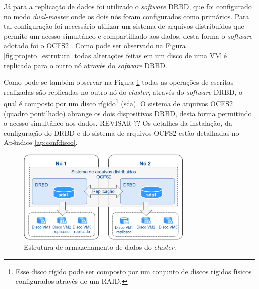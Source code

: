 \newpage
Já para a replicação de dados foi utilizado o \textit{software} \ac{DRBD}, que foi configurado no modo \textit{dual-master} onde os dois nós 
foram configurados como primários. Para tal configuração foi necessário utilizar um sistema de arquivos distribuídos que permite um acesso 
simultâneo e compartilhado aos dados, desta forma o \textit{software} adotado foi o \ac{OCFS2} \cite{ocfs2}. 
Como pode ser observado na Figura \ref{fig:projeto_estrutura} todas alterações feitas em um disco de uma \ac{VM} é replicada para o 
outro nó através do \textit{software} \ac{DRBD}. 

Como pode-se também observar na Figura \ref{fig:projeto_discos} todas as operações de escritas realizadas são replicadas no outro nó do
\textit{cluster}, através do \textit{software} \ac{DRBD}, o qual é composto por um disco rígido\footnote[1]{Esse disco rígido pode ser composto 
por um conjunto de discos rígidos físicos configurados através de um \ac{RAID}.} (sda). O sistema de arquivos \ac{OCFS2} (quadro pontilhado)
abrange os dois dispositivos \ac{DRBD}, desta forma permitindo o acesso simultâneo aos dados. 
REVISAR ??
Os detalhes da instalação, da configuração do \ac{DRBD} e do sistema de arquivos \ac{OCFS2} estão detalhadas no Apêndice \ref{ap:confdisco}. 

\begin{figure}[h!]
 \centering
 \includegraphics[width=320px]{img/projeto_discos.eps}
 \caption{Estrutura de armazenamento de dados do \textit{cluster}.}
 \label{fig:projeto_discos}
\end{figure}

